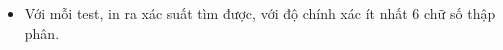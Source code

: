\begin{itemize}
	\item     Với mỗi test, in ra xác suất tìm được, với độ chính xác ít nhất 6 chữ số thập phân.   
\end{itemize}